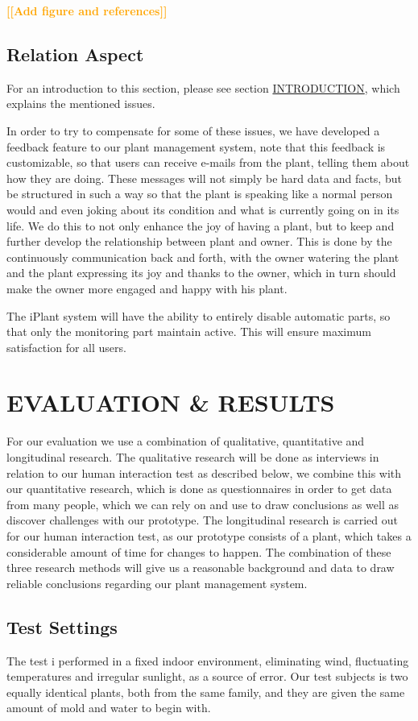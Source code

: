 \documentclass{ubicomp2012}
\newcommand{\todo}[1]{\textsf{\textbf{\textcolor{Orange}{[[#1]]}}}}
\begin{document}
\todo{Add figure and references}

\subsection{Relation Aspect}
For an introduction to this section, please see section \hyperlink{introduction}{INTRODUCTION}, which explains the mentioned issues.

In order to try to compensate for some of these issues, we have developed a feedback feature to our plant management system, note that this feedback is customizable, so that users can receive e-mails from the plant, telling them about how they are doing. These messages will not simply be hard data and facts, but be structured in such a way so that the plant is speaking like a normal person would and even joking about its condition and what is currently going on in its life.
We do this to not only enhance the joy of having a plant, but to keep and further develop the relationship between plant and owner. This is done by the continuously communication back and forth, with the owner watering the plant and the plant expressing its joy and thanks to the owner, which in turn should make the owner more engaged and happy with his plant.

The iPlant system will have the ability to entirely disable automatic parts, so that only the monitoring part maintain active. This will ensure maximum satisfaction for all users.

\section{EVALUATION \& RESULTS}
For our evaluation we use a combination of qualitative, quantitative and longitudinal \cite{longitudinal} research.
The qualitative research will be done as interviews in relation to our human interaction test as described below, we combine this with our quantitative research, which is done as questionnaires in order to get data from many people, which we can rely on and use to draw conclusions as well as discover challenges with our prototype. The longitudinal research is carried out for our human interaction test, as our prototype consists of a plant, which takes a considerable amount of time for changes to happen. The combination of these three research methods will give us a reasonable background and data to draw reliable conclusions regarding our plant management system.

\subsection{Test Settings}
The test i performed in a fixed indoor environment, eliminating wind, fluctuating temperatures and irregular sunlight, as a source of error. 
Our test subjects is two equally identical plants, both from the same family, and they are given the same amount of mold and water to begin with.
\end{document}
